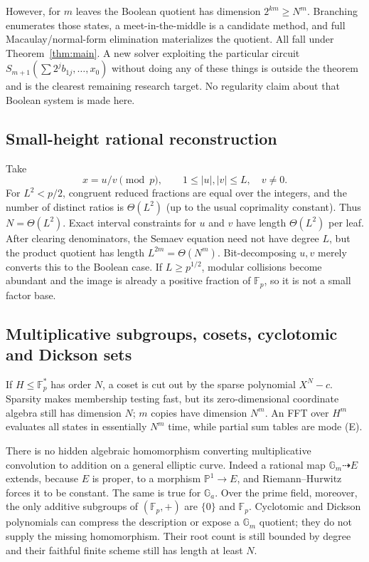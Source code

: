 \documentclass[11pt]{article}
\newcommand{\F}{\mathbb F}
\begin{document}
However, for $m$ leaves the Boolean quotient has dimension $2^{km}\ge N^m$.
Branching enumerates those states, a meet-in-the-middle is a candidate method,
and full Macaulay/normal-form elimination materializes the quotient.  All fall
under Theorem~\ref{thm:main}.  A new solver exploiting the particular circuit
$S_{m+1}(\sum2^jb_{1j},\ldots,x_0)$ without doing any of these things is outside
the theorem and is the clearest remaining research target.  No regularity
claim about that Boolean system is made here.

\subsection{Small-height rational reconstruction}

Take
\[
 x=u/v\pmod p,\qquad 1\le |u|,|v|\le L,\quad v\ne0.               \tag{14}
\]
For $L^2<p/2$, congruent reduced fractions are equal over the integers, and the
number of distinct ratios is $\Theta(L^2)$ (up to the usual coprimality
constant).  Thus $N=\Theta(L^2)$.  Exact interval constraints for $u$ and $v$
have length $\Theta(L^2)$ per leaf.  After clearing denominators, the Semaev
equation need not have degree $L$, but the product quotient has length
$L^{2m}=\Theta(N^m)$.  Bit-decomposing $u,v$ merely converts this to the Boolean
case.  If $L\ge p^{1/2}$, modular collisions become abundant and the image is
already a positive fraction of $\F_p$, so it is not a small factor base.

\subsection{Multiplicative subgroups, cosets, cyclotomic and Dickson sets}

If $H\le\F_p^*$ has order $N$, a coset is cut out by the sparse polynomial
$X^N-c$.  Sparsity makes membership testing fast, but its zero-dimensional
coordinate algebra still has dimension $N$; $m$ copies have dimension $N^m$.
An FFT over $H^m$ evaluates all states in essentially $N^m$ time, while partial
sum tables are mode (E).

There is no hidden algebraic homomorphism converting multiplicative convolution
to addition on a general elliptic curve.  Indeed a rational map
$\mathbb G_m\dashrightarrow E$ extends, because $E$ is proper, to a morphism
$\mathbb P^1\to E$, and Riemann--Hurwitz forces it to be constant.  The same is
true for $\mathbb G_a$.  Over the prime field, moreover, the only additive
subgroups of $(\F_p,+)$ are $\{0\}$ and $\F_p$.  Cyclotomic and Dickson
polynomials can compress the description or expose a $\mathbb G_m$ quotient;
they do not supply the missing homomorphism.  Their root count is still bounded
by degree and their faithful finite scheme still has length at least $N$.
\end{document}
